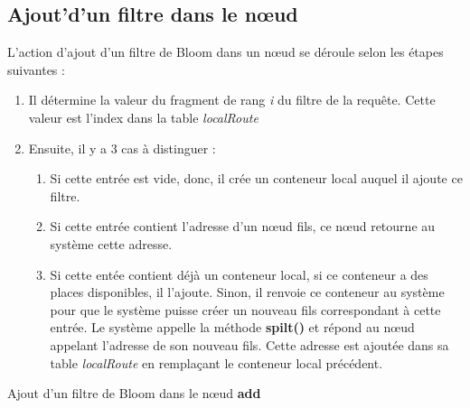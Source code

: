 \documentclass[a4paper,11pt]{report}
\begin{document}
\subsection{Ajout'd'un filtre dans le nœud}
	L'action d'ajout d'un filtre de Bloom dans un nœud se déroule selon les étapes suivantes : 
	\begin{enumerate}
		\item Il détermine la valeur du fragment de rang \textit{i} du filtre de la requête. Cette valeur est l'index dans la table \textit{localRoute}
		\item Ensuite, il y a 3 cas à distinguer :
			\begin{enumerate}
				\item Si cette entrée est vide, donc, il crée un conteneur local auquel il ajoute ce filtre.
				\item Si cette entrée contient l'adresse d'un nœud fils, ce nœud retourne au système cette adresse.
				\item Si cette entée contient déjà un conteneur local, si ce conteneur a des places disponibles, il l'ajoute. Sinon, il renvoie ce conteneur au système pour que le système puisse créer un nouveau fils correspondant à cette entrée. Le système appelle la méthode \textbf{spilt()} et répond au nœud appelant l'adresse de son nouveau fils. Cette adresse est ajoutée dans sa table \textit{localRoute} en remplaçant le conteneur local précédent.
			\end{enumerate}
\end{enumerate}

\begin{algorithme}
	Ajout d'un filtre de Bloom dans le nœud \textbf{add}
\end{algorithme}
\end{document}

